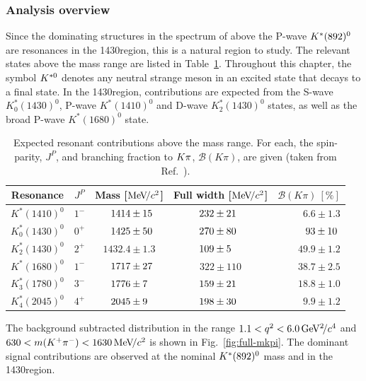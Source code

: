 \subsubsection{Analysis overview}

Since the dominating structures in the \kpi spectrum of \BdToKpimm above the P-wave ${{K}^*}(892)^{0}$ are resonances in the 1430\mevcc region, this is a natural region to study. The relevant \Kstarz states above the \KstP mass range are listed in Table~\ref{tab:introduction:states}. Throughout this chapter, the symbol ${{K}^{*0}}$ denotes any neutral strange meson in an excited state that decays to a \Kp\pim final state. In the 1430\mevcc region, contributions are expected from the S-wave $K^\ast_0(1430)^0$, P-wave $K^\ast(1410)^0$ and D-wave $K^\ast_2(1430)^0$ states, as well as the broad P-wave $K^\ast(1680)^0$ state. 

\begin{table}[!tb]
\caption{Expected resonant contributions above the \KstP mass range. For each, the spin-parity, $J^P$, and branching fraction to ${K}{\pi}$, $\mathcal{B}(K\pi)$, are given (taken from Ref.~\cite{lu-wang}).}
\label{tab:introduction:states}
\centering
\begin{tabular}{c|c|c|c|r}
    Resonance & $J^{P}$ & Mass [$\mathrm{Me\kern -0.1em V\!/}c^2$] & Full width [$\mathrm{Me\kern -0.1em V\!/}c^2$]  & $\mathcal{B}(K\pi)~[\%]$ \\
   \hline
   $K^\ast(1410)^0$ & $1^{-}$& $\hphantom{0.}1414 \pm 15\hphantom{.}$& $232 \pm 21\hphantom{0}$  & $6.6 \pm 1.3$ \\
   $K^\ast_0(1430)^0$ & $0^{+}$ & $\hphantom{0.}1425 \pm 50\hphantom{.}$ & $270 \pm 80\hphantom{0}$ & $\hphantom{.}93 \pm 10\hphantom{.}$ \\
   $K^\ast_2(1430)^0$ & $2^{+}$ & $1432.4\pm 1.3$ & $109 \pm 5\hphantom{00}$ & $49.9 \pm 1.2$ \\
   $K^\ast(1680)^0$ & $1^{-}$ & $\hphantom{0.}1717 \pm 27\hphantom{.}$ & $322 \pm 110$ & $38.7 \pm 2.5$ \\
   $K^\ast_3(1780)^0$ & $3^{-}$ & $\hphantom{0.}1776 \pm 7\hphantom{0.}$ & $159 \pm 21\hphantom{0}$ & $18.8 \pm 1.0$ \\
   $K^\ast_4(2045)^0$ & $4^{+}$ & $\hphantom{0.}2045 \pm 9\hphantom{0.}$ & $198 \pm 30\hphantom{0}$ & $9.9 \pm 1.2$ \\
 \end{tabular}
 \end{table}

The background subtracted \mkpi distribution in the range $1.1<{q^2}<6.0{\mathrm{\,Ge\kern -0.1em V^2\!/}c^4}$ and $630<m({{K}^+}{{\pi}^-})<1630{\mathrm{\,Me\kern -0.1em V\!/}c^2}$ is shown in Fig.~\ref{fig:full-mkpi}. The dominant signal contributions are observed at the nominal ${{K}^*}(892)^{0}$ mass and in the 1430\mevcc region. 

